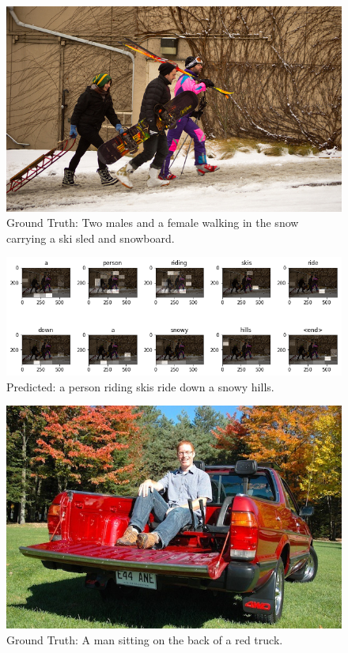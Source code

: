 \begin{figure}[t!]
    \centering
    \includegraphics[width=13cm]{images/ch5/example2.png}
    \caption{Ground Truth: Two males and a female walking in the snow carrying a ski sled and snowboard.}
    \label{fig:example2}
\end{figure}

\begin{figure}[b!]
    \centering
    \includegraphics[width=15cm]{images/ch5/example2-attention.png}
    \caption{Predicted: a person riding skis ride down a snowy hills.}
    \label{fig:example2-att}
\end{figure}


\begin{figure}[t!]
    \centering
    \includegraphics[width=13cm]{images/ch5/example3.png}
    \caption{Ground Truth: A man sitting on the back of a red truck.}
    \label{fig:example3}
\end{figure}

